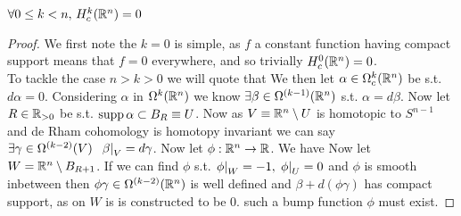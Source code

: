 \documentclass{article}
\begin{document}
\begin{prop}
$\forall 0 \leq k < n, \, H_c^k(\mathbb{R}^n) = 0$
\end{prop}
\begin{proof}
We first note the $k=0$ is simple, as $f$ a constant function having compact support means that $f=0$ everywhere, and so trivially $H_c^0(\mathbb{R}^n) = 0$.\\
To tackle the case $n > k >0$ we will quote that
We then let $\alpha \in \Omega^k_c(\mathbb{R}^n)$ be s.t. $d\alpha = 0$. Considering $\alpha$ in $\Omega^k(\mathbb{R}^n)$ we know $\exists \beta \in \Omega^{(k-1)}(\mathbb{R}^n)$ s.t. $\alpha = d\beta$. Now let $R \in \mathbb{R}_{>0}$ be s.t. $\operatorname{supp} \alpha \subset B_R \equiv U$. Now as $V \equiv \mathbb{R}^n \setminus U $ is homotopic to $S^{n-1}$ and de Rham cohomology is homotopy invariant we can say $\exists \gamma \in \Omega^{(k-2)}(V)\ \,  \ev{\beta}{V}= d\gamma$. Now let $\phi : \mathbb{R}^n \to \mathbb{R}$. We have 
Now let $W= \mathbb{R}^n \setminus B_{R+1}$. If we can find $\phi$ s.t. $\left. \phi \right\rvert_{W} = -1, \, \left. \phi \right\rvert_{U} = 0$ and $\phi$ is smooth inbetween then $\phi\gamma \in \Omega^{(k-2)}(\mathbb{R}^n)$ is well defined and $\beta + d(\phi\gamma)$ has compact support, as on $W$ is is constructed to be 0. such a bump function $\phi$ must exist.
\end{proof}
\end{document}
